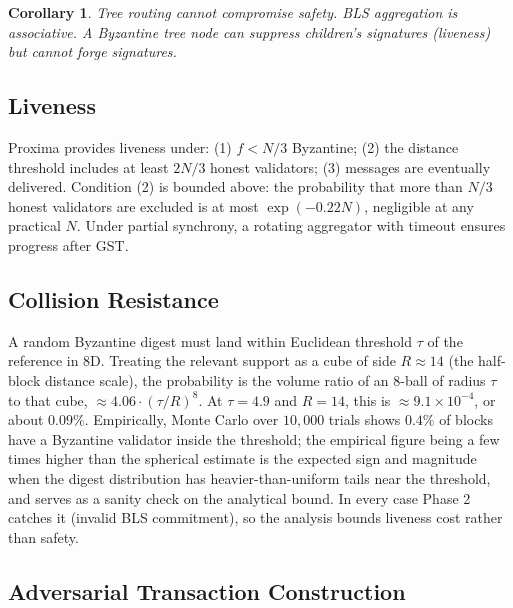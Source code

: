 \documentclass[conference]{IEEEtran}
\newtheorem{corollary}{Corollary}
\begin{document}
\begin{corollary}
Tree routing cannot compromise safety. BLS aggregation is associative. A Byzantine tree node can suppress children's signatures (liveness) but cannot forge signatures.
\end{corollary}

\subsection{Liveness}

Proxima provides liveness under: (1) $f < N/3$ Byzantine; (2) the distance threshold includes at least $2N/3$ honest validators; (3) messages are eventually delivered. Condition (2) is bounded above: the probability that more than $N/3$ honest validators are excluded is at most $\exp(-0.22 N)$, negligible at any practical $N$. Under partial synchrony, a rotating aggregator with timeout ensures progress after GST.

\subsection{Collision Resistance}

A random Byzantine digest must land within Euclidean threshold $\tau$ of the reference in 8D. Treating the relevant support as a cube of side $R \approx 14$ (the half-block distance scale), the probability is the volume ratio of an 8-ball of radius $\tau$ to that cube, $\approx 4.06 \cdot (\tau / R)^8$. At $\tau = 4.9$ and $R = 14$, this is $\approx 9.1 \times 10^{-4}$, or about $0.09\%$. Empirically, Monte Carlo over $10{,}000$ trials shows $0.4\%$ of blocks have a Byzantine validator inside the threshold; the empirical figure being a few times higher than the spherical estimate is the expected sign and magnitude when the digest distribution has heavier-than-uniform tails near the threshold, and serves as a sanity check on the analytical bound. In every case Phase 2 catches it (invalid BLS commitment), so the analysis bounds liveness cost rather than safety.

\subsection{Adversarial Transaction Construction}
\end{document}
